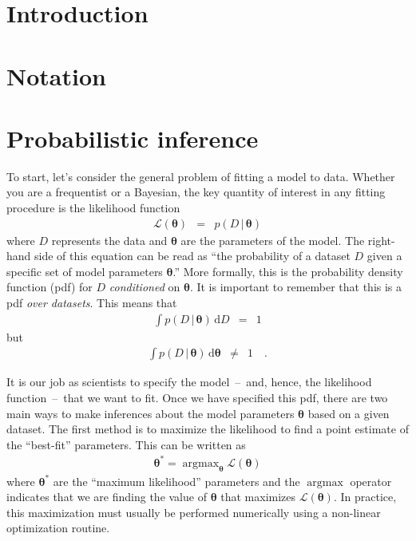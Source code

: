 \documentclass[modern, letterpaper]{aastex61}
\newcommand{\dd}{\ensuremath{\,\mathrm{d}}}
\newcommand{\bvec}[1]{{\ensuremath{\boldsymbol{#1}}}}
\DeclareMathOperator*{\argmax}{argmax}
\begin{document}
\keywords{%
}

\section{Introduction}

\section{Notation}

\section{Probabilistic inference}

To start, let's consider the general problem of fitting a model to data.
Whether you are a frequentist or a Bayesian, the key quantity of interest in
any fitting procedure is the likelihood function
\begin{eqnarray}
\mathcal{L}(\bvec{\theta}) &=& p(D\,|\,\bvec{\theta})
\end{eqnarray}
where $D$ represents the data and $\bvec{\theta}$ are the parameters of the
model.
The right-hand side of this equation can be read as ``the probability of a
dataset $D$ given a specific set of model parameters $\bvec{\theta}$.''
More formally, this is the probability density function (pdf) for $D$
\emph{conditioned} on $\bvec{\theta}$.
It is important to remember that this is a pdf \emph{over datasets}.
This means that
\begin{eqnarray}
\int p(D\,|\,\bvec{\theta}) \dd D &=& 1
\end{eqnarray}
but
\begin{eqnarray}
    \int p(D\,|\,\bvec{\theta}) \dd \bvec{\theta} &\ne& 1 \quad.
\end{eqnarray}

It is our job as scientists to specify the model~--~and, hence, the likelihood
function~--~that we want to fit.
Once we have specified this pdf, there are two main ways to make inferences
about the model parameters $\bvec{\theta}$ based on a given dataset.
The first method is to maximize the likelihood to find a point estimate of the
``best-fit'' parameters.
This can be written as
\begin{eqnarray}
\bvec{\theta}^* = \argmax_{\bvec{\theta}} \mathcal{L}(\bvec{\theta})
\end{eqnarray}
where $\bvec{\theta}^*$ are the ``maximum likelihood'' parameters and the
$\argmax$ operator indicates that we are finding the value of $\bvec{\theta}$
that maximizes $\mathcal{L}(\bvec{\theta})$.
In practice, this maximization must usually be performed numerically using a
non-linear optimization routine.
\end{document}
